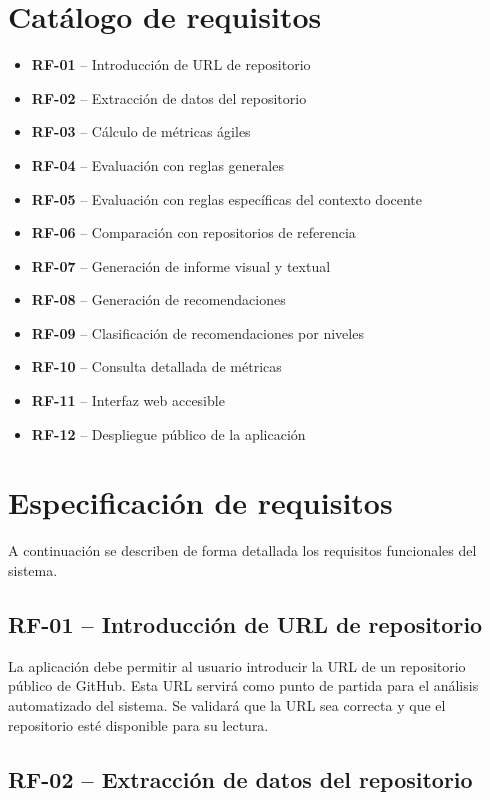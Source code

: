 \section{Catálogo de requisitos}

\begin{itemize}
    \item \textbf{RF-01} – Introducción de URL de repositorio
    \item \textbf{RF-02} – Extracción de datos del repositorio
    \item \textbf{RF-03} – Cálculo de métricas ágiles
    \item \textbf{RF-04} – Evaluación con reglas generales
    \item \textbf{RF-05} – Evaluación con reglas específicas del contexto docente
    \item \textbf{RF-06} – Comparación con repositorios de referencia
    \item \textbf{RF-07} – Generación de informe visual y textual
    \item \textbf{RF-08} – Generación de recomendaciones
    \item \textbf{RF-09} – Clasificación de recomendaciones por niveles
    \item \textbf{RF-10} – Consulta detallada de métricas
    \item \textbf{RF-11} – Interfaz web accesible
    \item \textbf{RF-12} – Despliegue público de la aplicación
\end{itemize}

\section{Especificación de requisitos}

A continuación se describen de forma detallada los requisitos funcionales del sistema.

\subsection*{RF-01 – Introducción de URL de repositorio}

La aplicación debe permitir al usuario introducir la URL de un repositorio público de GitHub. Esta URL servirá como punto de partida para el análisis automatizado del sistema. Se validará que la URL sea correcta y que el repositorio esté disponible para su lectura.

\subsection*{RF-02 – Extracción de datos del repositorio}

